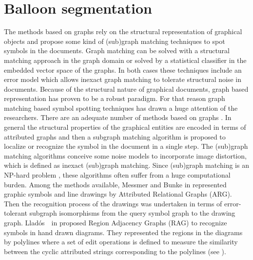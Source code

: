 \section{Balloon segmentation}
\label{sec:sota-ss:graph}
The methods based on graphs rely on the structural representation of graphical objects and propose some kind of (sub)graph matching techniques to spot symbols in the documents. Graph matching can be solved with a structural matching approach in the graph domain or solved by a statistical classifier in the embedded vector space of the graphs. In both cases these techniques include an error model which allows inexact graph matching to tolerate structural noise in documents. Because of the structural nature of graphical documents, graph based representation has proven to be a robust paradigm. For that reason graph matching based symbol spotting techniques has drawn a huge attention of the researchers. There are an adequate number of methods based on graphs \cite{Messmer1996,LladosPAMI2001,Barbu2005a,Qureshi2007,Locteau2007,Rusinol2009a,Nayef2010,Luqman2010,LeBodic2012}. In general the structural properties of the graphical entities are encoded in terms of attributed graphs and then a subgraph matching algorithm is proposed to localize or recognize the symbol in the document in a single step. The (sub)graph matching algorithms conceive some noise models to incorporate image distortion, which is defined as inexact (sub)graph matching. Since (sub)graph matching is an NP-hard problem \cite{Mehlhorn1984}, these algorithms often suffer from a huge computational burden. Among the methods available, Messmer and Bunke in \cite{Messmer1996} represented graphic symbols and line drawings by Attributed Relational Graphs (ARG). Then the recognition process of the drawings was undertaken in terms of error-tolerant subgraph isomorphisms from the query symbol graph to the drawing graph. Llad\'{o}s~\etal~in \cite{LladosPAMI2001} proposed Region Adjacency Graphs (RAG) to recognize symbols in hand drawn diagrams. They represented the regions in the diagrams by polylines where a set of edit operations is defined to measure the similarity between the cyclic attributed strings corresponding to the polylines (see ).

